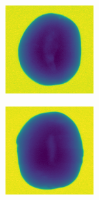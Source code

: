 \documentclass[11pt]{article}
\begin{document}
    \clearpage
    \begin{figure}[!h]
    \captionsetup[subfigure]{labelformat=empty}
    \ContinuedFloat
    \captionsetup{list=no}
    \begin{subfigure}[b]{0.22\textwidth}
         \centering
         \includegraphics[width=\textwidth]{figurer/potato_dataset/hollow/hollow_20.jpg}
         \caption{}
         \label{fig:hollow_20}
     \end{subfigure}
     \hfill
     \begin{subfigure}[b]{0.22\textwidth}
         \centering
         \includegraphics[width=\textwidth]{figurer/potato_dataset/hollow/hollow_21.jpg}

\end{subfigure}
\end{figure}
\end{document}
